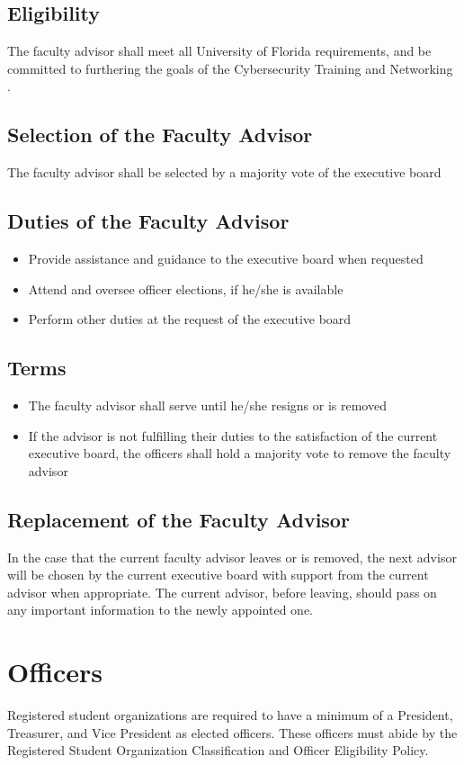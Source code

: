 \documentclass{article}
\def\clubfullname{Cybersecurity Training and Networking }
\begin{document}
\subsection{Eligibility}
The faculty advisor shall meet all University of Florida requirements, and be committed to furthering the goals of the \clubfullname.

\subsection{Selection of the Faculty Advisor}
The faculty advisor shall be selected by a majority vote of the executive board

\subsection{Duties of the Faculty Advisor}
\begin{itemize}
    \item Provide assistance and guidance to the executive board when requested
    \item Attend and oversee officer elections, if he/she is available
    \item Perform other duties at the request of the executive board
\end{itemize}
\subsection{Terms}
\begin{itemize}
    \item The faculty advisor shall serve until he/she resigns or is removed
    \item If the advisor is not fulfilling their duties to the satisfaction of the current executive board, the officers shall hold a majority vote to remove the faculty advisor

\end{itemize}
\subsection{Replacement of the Faculty Advisor}
In the case that the current faculty advisor leaves or is removed, the next advisor will be chosen by the current executive board with support from the current advisor when appropriate. 
The current advisor, before leaving, should pass on any important information to the newly appointed one. 


\section{Officers}
Registered student organizations are required to have a minimum of a President, Treasurer, and Vice President as elected officers. These officers must abide by the Registered Student Organization Classification and Officer Eligibility Policy.
\end{document}

